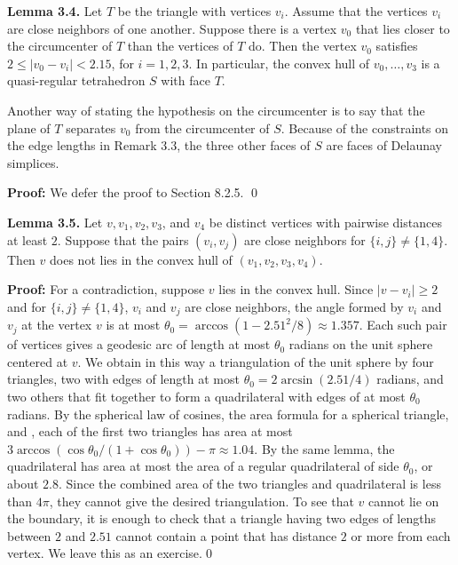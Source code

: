 \bigskip
{\bf Lemma 3.4.}  Let $T$ be the triangle with vertices
$v_i$.  Assume that the vertices $v_i$ are close
neighbors of one another.
Suppose there is a vertex $v_0$ that lies 
closer to the circumcenter
of $T$ than the vertices of $T$ do.
Then the vertex $v_0$ satisfies $2\le |v_0-v_i|< 2.15$,
for $i=1,2,3$.  In particular, the convex hull of $v_0,\ldots,v_3$
is a quasi-regular
tetrahedron $S$ with face $T$.

\bigskip
Another way of stating the hypothesis on the circumcenter
is to say that the plane of $T$ separates $v_0$ from the
circumcenter of $S$.
Because of the constraints on the edge lengths in Remark 3.3,
the three other
faces of $S$ are faces of Delaunay simplices.

\bigskip
{\bf Proof:}  We defer the proof to Section 8.2.5.
\qed

\bigskip
{\bf Lemma 3.5.}  Let $v,v_1,v_2,v_3$, and $v_4$ be distinct
vertices with pairwise distances at least $2$.  Suppose that
the pairs $(v_i,v_j)$ are close neighbors for $\{i,j\}\ne\{1,4\}$.
Then $v$ does not lies in the convex hull of $(v_1,v_2,v_3,v_4)$.

\bigskip
{\bf Proof:} For a contradiction, suppose $v$ lies in the convex hull.
Since $|v-v_i| \ge 2$ and
for $\{i,j\}\ne\{1,4\}$,
 $v_i$ and $v_j$ are close neighbors,
the angle formed
by $v_i$ and $v_j$ at the vertex $v$ is at most
$\theta_0 = \arccos(1-2.51^2/8) \approx 1.357$.
Each such pair of vertices gives a geodesic arc of length at most
$\theta_0$ radians on the unit sphere centered at $v$.
We obtain in this
way a triangulation of the unit sphere by 
four triangles,
two with edges of length
at most $\theta_0=2\arcsin(2.51/4)$ radians, and two others
that fit together to form a quadrilateral with edges of at most $\theta_0$ radians.
By the spherical law of cosines, the area formula for a spherical triangle,
and \cite{H2,6.1}, each of the first two triangles has 
area at most
$3\arccos(\cos\theta_0/(1+\cos\theta_0)) -\pi \approx 1.04$.  
By the same lemma,
the quadrilateral
has area at most the area of a regular quadrilateral of side $\theta_0$, or
about $2.8$.
Since the combined area of the two triangles
and quadrilateral is less than $4\pi$, they cannot give the
desired triangulation.
To see that $v$ cannot lie on the boundary, it is enough to check
that a triangle having two edges of lengths between $2$ and $2.51$
cannot contain a point that has distance $2$ or more from each
vertex.  We leave this as an exercise.\qed


\bigskip

